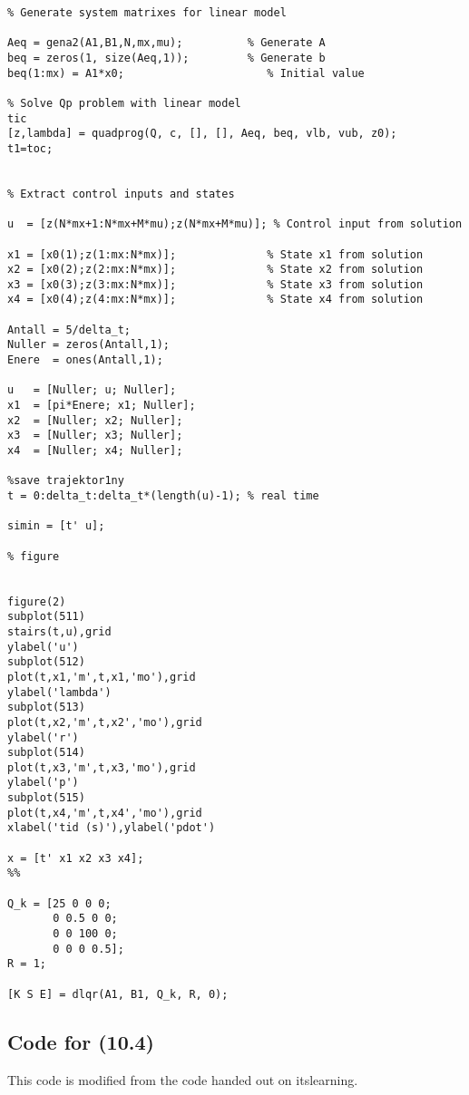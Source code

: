 \begin{lstlisting}
% Generate system matrixes for linear model

Aeq = gena2(A1,B1,N,mx,mu);          % Generate A
beq = zeros(1, size(Aeq,1));         % Generate b
beq(1:mx) = A1*x0; 	        	        % Initial value

% Solve Qp problem with linear model
tic
[z,lambda] = quadprog(Q, c, [], [], Aeq, beq, vlb, vub, z0);
t1=toc;


% Extract control inputs and states

u  = [z(N*mx+1:N*mx+M*mu);z(N*mx+M*mu)]; % Control input from solution

x1 = [x0(1);z(1:mx:N*mx)];              % State x1 from solution
x2 = [x0(2);z(2:mx:N*mx)];              % State x2 from solution
x3 = [x0(3);z(3:mx:N*mx)];              % State x3 from solution
x4 = [x0(4);z(4:mx:N*mx)];              % State x4 from solution

Antall = 5/delta_t;
Nuller = zeros(Antall,1);
Enere  = ones(Antall,1);

u   = [Nuller; u; Nuller];
x1  = [pi*Enere; x1; Nuller];
x2  = [Nuller; x2; Nuller];
x3  = [Nuller; x3; Nuller];
x4  = [Nuller; x4; Nuller];

%save trajektor1ny
t = 0:delta_t:delta_t*(length(u)-1); % real time

simin = [t' u];

% figure
                

figure(2)
subplot(511)
stairs(t,u),grid
ylabel('u')
subplot(512)
plot(t,x1,'m',t,x1,'mo'),grid
ylabel('lambda')
subplot(513)
plot(t,x2,'m',t,x2','mo'),grid
ylabel('r')
subplot(514)
plot(t,x3,'m',t,x3,'mo'),grid
ylabel('p')
subplot(515)
plot(t,x4,'m',t,x4','mo'),grid
xlabel('tid (s)'),ylabel('pdot')

x = [t' x1 x2 x3 x4];
%%

Q_k = [25 0 0 0;
       0 0.5 0 0;
       0 0 100 0;
       0 0 0 0.5];
R = 1;

[K S E] = dlqr(A1, B1, Q_k, R, 0);

\end{lstlisting}

\subsection{Code for (10.4)}

This code is modified from the code handed out on itslearning.

